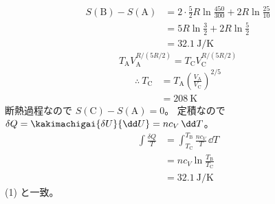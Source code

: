 \begin{align*}
S(\mathrm{B})-S(\mathrm{A})&=2\cdot\frac{5}{2}R\ln\frac{450}{300}+2R\ln\frac{25}{10}\\
&=5R\ln\frac{3}{2}+2R\ln\frac{5}{2}\\
&=\qty{32.1}{\joule\per\kelvin}
\end{align*}
\[ T_{\mathrm{A}}V_{\mathrm{A}}^{R/(5R/2)}=T_{\mathrm{C}}V_{\mathrm{C}}^{R/(5R/2)} \]
\begin{align*}
\therefore\ T_{\mathrm{C}}&=T_{\mathrm{A}}\left(\frac{V_{\mathrm{A}}}{V_{\mathrm{C}}}\right)^{2/5}\\
&=\qty{208}{\kelvin}
\end{align*}
断熱過程なので $S(\mathrm{C})-S(\mathrm{A})=0$。
定積なので $\delta Q=\kakimachigai{\delta U}{\dd U}=nc_{V}\,\dd T$。
\begin{align*}
\int\frac{\delta Q}{T}&=\int_{T_{\mathrm{C}}}^{T_{\mathrm{B}}}\frac{nc_{V}}{T}\,\dd T\\
&=nc_{V}\ln\frac{T_{\mathrm{B}}}{T_{\mathrm{C}}}\\
&=\qty{32.1}{\joule\per\kelvin}
\end{align*}
(1) と一致。
